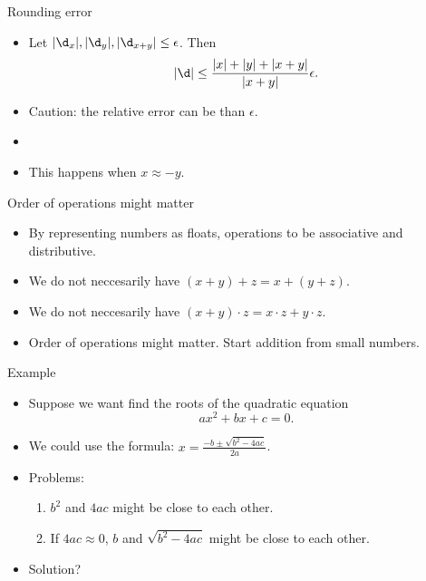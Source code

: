 \documentclass[11pt,xcolor={dvipsnames},aspectratio=159,hyperref={pdftex,pdfpagemode=UseNone,hidelinks,pdfdisplaydoctitle=true},usepdftitle=false]{beamer}
\begin{document}
\begin{frame}{Rounding error}
    \begin{itemize}
     \item Let $|\d_x|, |\d_y|, |\d_{x+y}| \leq \epsilon$. Then 
     $$ |\d| \leq \frac{|x| + |y| + |x+y|} {|x+y|} \epsilon. $$
    \item Caution: the relative error can be  than $\epsilon$.
    \item {}
    \item This happens when $x\approx -y$.
   \end{itemize}
\end{frame}

\begin{frame}{Order of operations might matter}
    \begin{itemize}
     \item By representing numbers as floats, operations  to be associative and distributive.
     \item We do not neccesarily have $(x + y) + z = x + (y + z)$.
     \item We do not neccesarily have $(x + y) \cdot z = x \cdot z + y \cdot z$.
     \item Order of operations might matter. Start addition from small numbers.
    \end{itemize}
\end{frame}

\begin{frame}{Example}
    \begin{itemize}
     \item Suppose we want find the roots of the quadratic equation $$ax^2 +bx + c = 0.$$
     \item We could use the formula: $x = \frac{-b \pm \sqrt{b^2 - 4ac}}{2a}$.
     \item Problems: \begin{enumerate} \item  $b^2$ and $4ac$ might be close to each other. \item If $4ac\approx0$, $b$ and $\sqrt{b^2 - 4ac}$ might be close to each other.
     \end{enumerate}
    
     \item Solution? 
    \end{itemize}
\end{frame}
\end{document}
